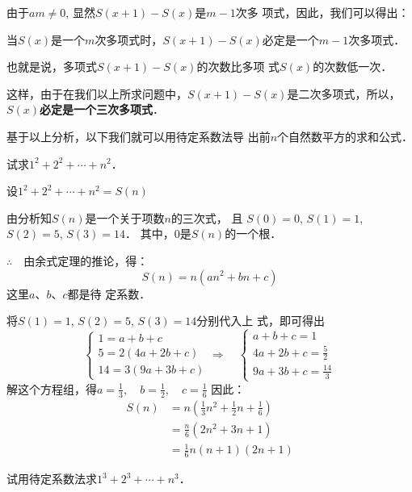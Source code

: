 由于$am\ne 0$, 显然$S(x+1)-S(x)$是$m-1$次多
项式，因此，我们可以得出：

\begin{blk}{}
    当$S(x)$是一个$m$次多项式时，$S(x+1)-S(x)$必定是一个$m-1$次多项式．
\end{blk}

也就是说，多项式$S(x+1)-S(x)$的次数比多项
式$S(x)$的次数低一次．

这样，由于在我们以上所求问题中，$S(x+1)-S(x)$是二次多项式，所以，
\textbf{$S(x)$必定是一个三次多项式}．

基于以上分析，以下我们就可以用待定系数法导
出前$n$个自然数平方的求和公式．


\begin{example}
    试求$1^2+2^2+\cdots+n^2$．
\end{example}


\begin{solution}
    设$1^2+2^2+\cdots+n^2=S(n)$

由分析知$S(n)$是一个关于项数$n$的三次式，
且 $S(0)=0$, $S(1)=1$, $S(2)=5$, $S(3)=14$．
其中，0是$S(n)$的一个根．

$\therefore\quad $由余式定理的推论，得：
\[S(n)=n(an^2+bn+c)\]
这里$a$、$b$、$c$都是待
定系数．

将$S(1)=1$, $S(2)=5$, $S(3)=14$分别代入上
式，即可得出
\[\begin{cases}
    1=a+b+c\\
5=2(4a+2b+c)\\
14=3(9a+3b+c)
\end{cases}\Rightarrow\quad \begin{cases}
    a+b+c=1\\
4a+2b+c=\frac{5}{2}\\
9a+3b+c=\frac{14}{3}
\end{cases}\]
解这个方程组，得$a=\frac{1}{3},\quad b=\frac{1}{2},\quad c=\frac{1}{6}$
因此：
\[\begin{split}
    S(n)&=n\left(\frac{1}{3}n^2+\frac{1}{2}n+\frac{1}{6}\right)\\
&=\frac{n}{6}(2n^2+3n+1)\\
&=\frac{1}{6}n(n+1)(2n+1)
\end{split}\]
\end{solution}


\begin{ex}
    试用待定系数法求$1^3+2^3+\cdots+n^3$．
\end{ex}



